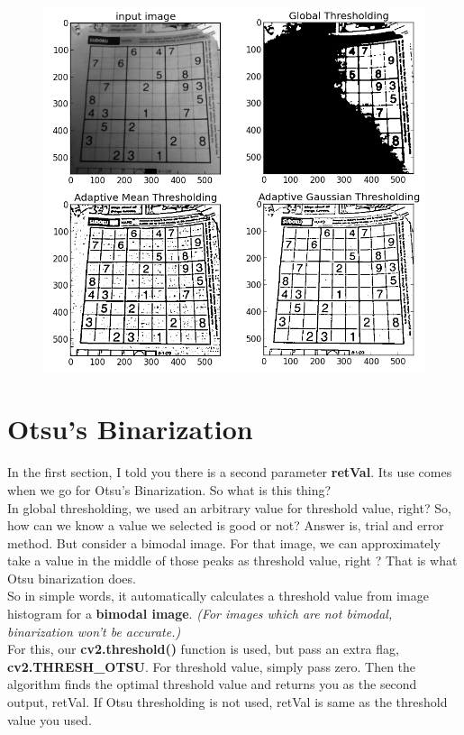 \documentclass[a4paper,11pt]{book}
\begin{document}
\begin{figure}[htp]
\centering
\includegraphics[scale=0.4]{img/thresh_2.png}
\caption{}
\label{}
\end{figure}

\section{Otsu's Binarization}

In the first section, I told you there is a second parameter \textbf{retVal}. Its use comes when we go for Otsu's Binarization. So what is this thing?\\

In global thresholding, we used an arbitrary value for threshold value, right? So, how can we know a value we selected is good or not? Answer is, trial and error method. But consider a bimodal image. For that image, we can approximately take a value in the middle of those peaks as threshold value, right ? That is what Otsu binarization does. \\

So in simple words, it automatically calculates a threshold value from image histogram for a \textbf{bimodal image}. \textit{(For images which are not bimodal, binarization won't be accurate.)}\\

For this, our \textbf{cv2.threshold()} function is used, but pass an extra flag, \textbf{cv2.THRESH\_OTSU}. For threshold value, simply pass zero. Then the algorithm finds the optimal threshold value and returns you as the second output, retVal. If Otsu thresholding is not used, retVal is same as the threshold value you used. \\
\end{document}
